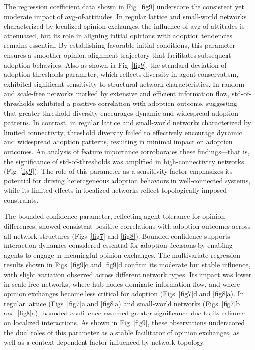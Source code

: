 \documentclass[10pt,letterpaper]{article}
\begin{document}
The regression coefficient data shown in Fig~\ref{fig9} underscore the consistent yet moderate impact of avg-of-attitudes. In regular lattice and small-world networks characterized by localized opinion exchanges, the influence of avg-of-attitudes is attenuated, but its role in aligning initial opinions with adoption tendencies remains essential. By establishing favorable initial conditions, this parameter ensures a smoother opinion alignment trajectory that facilitates subsequent adoption behaviors. Also as shown in Fig~\ref{fig9}, the standard deviation of adoption thresholds parameter, which reflects diversity in agent conservatism, exhibited significant sensitivity to structural network characteristics. In random and scale-free networks marked by extensive and efficient information flow, std-of-thresholds exhibited a positive correlation with adoption outcome, suggesting that greater threshold diversity encourages dynamic and widespread adoption patterns. In contrast, in regular lattice and small-world networks characterized by limited connectivity, threshold diversity failed to effectively encourage dynamic and widespread adoption patterns, resulting in minimal impact on adoption outcomes. An analysis of feature importance corroborates these findings---that is, the significance of std-of-thresholds was amplified in high-connectivity networks (Fig~\ref{fig9}). The role of this parameter as a sensitivity factor emphasizes its potential for driving heterogeneous adoption behaviors in well-connected systems, while its limited effects in localized networks reflect topologically-imposed constraints.

The bounded-confidence parameter, reflecting agent tolerance for opinion differences, showed consistent positive correlations with adoption outcomes across all network structures (Figs~\ref{fig7} and \ref{fig8}). Bounded-confidence supports interaction dynamics considered essential for adoption decisions by enabling agents to engage in meaningful opinion exchanges. The multivariate regression results shown in Figs~\ref{fig9}c and \ref{fig9}d confirm its moderate but stable influence, with slight variation observed across different network types. Its impact was lower in scale-free networks, where hub nodes dominate information flow, and where opinion exchanges become less critical for adoption (Figs~\ref{fig7}d and \ref{fig8}a). In regular lattice (Figs~\ref{fig7}a and \ref{fig8}a) and small-world networks (Figs~\ref{fig7}b and \ref{fig8}a), bounded-confidence assumed greater significance due to its reliance on localized interactions. As shown in Fig~\ref{fig9}, these observations underscored the dual roles of this parameter as a stable facilitator of opinion exchanges, as well as a context-dependent factor influenced by network topology.
\end{document}
